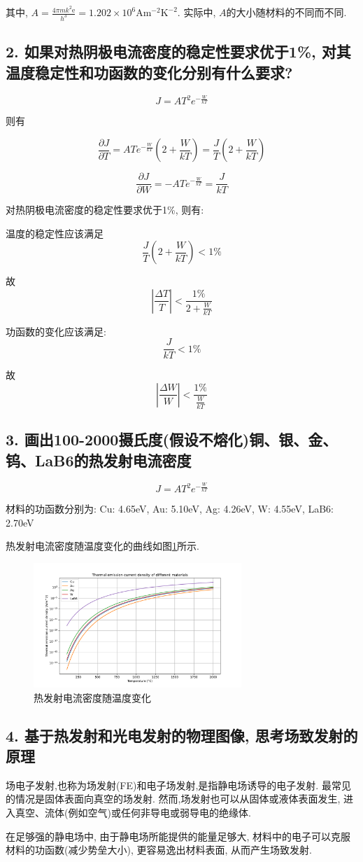 \documentclass{article}
\begin{document}
其中, $A = \frac{4\pi m k^2 \text{e}}{h^3}= 1.202 \times 10^6 \text{A}\text{m}^{-2}\text{K}^{-2}$. 实际中, $A$的大小随材料的不同而不同.

\subsection*{2. 如果对热阴极电流密度的稳定性要求优于1\%, 对其温度稳定性和功函数的变化分别有什么要求?}

$$ J = AT^2 e^{-\frac{W}{kT}}$$

则有

$$\frac{\partial J}{\partial T} = AT e^{-\frac{W}{kT}}\left(2+\frac{W}{kT}\right) = \frac{J}{T}(2+\frac{W}{kT})$$

$$\frac{\partial J}{\partial W} = -AT e^{-\frac{W}{kT}} = \frac{J}{kT}$$

对热阴极电流密度的稳定性要求优于1\%, 则有:

温度的稳定性应该满足 $$\frac{J}{T}(2+\frac{W}{kT})<1\%$$

故$$\left\lvert \frac{\Delta T}{T} \right\rvert <\frac{1\%}{2+\frac{W}{kT}}$$

功函数的变化应该满足: $$\frac{J}{kT}<1\%$$

故$$\left\lvert \frac{\Delta W}{W} \right\rvert <\frac{1\%}{\frac{W}{kT}}$$

\subsection*{3. 画出100-2000摄氏度(假设不熔化)铜、银、金、钨、LaB6的热发射电流密度}

$$J = A T^2 e^{-\frac{W}{kT}}$$

材料的功函数分别为: Cu: 4.65eV, Au: 5.10eV, Ag: 4.26eV, W: 4.55eV, LaB6: 2.70eV

热发射电流密度随温度变化的曲线如图\ref{fig:J-T}所示.

\begin{figure}[ht]
    \centering
    \includegraphics[width=0.7\textwidth]{img/J-T.pdf}
    \caption{热发射电流密度随温度变化}
    \label{fig:J-T}
\end{figure}

\subsection*{4. 基于热发射和光电发射的物理图像, 思考场致发射的原理}

场电子发射,也称为场发射(FE)和电子场发射,是指静电场诱导的电子发射. 最常见的情况是固体表面向真空的场发射. 然而,场发射也可以从固体或液体表面发生, 进入真空、流体(例如空气)或任何非导电或弱导电的绝缘体.\cite{Field-electron-emission}

在足够强的静电场中, 由于静电场所能提供的能量足够大, 材料中的电子可以克服材料的功函数(减少势垒大小), 更容易逸出材料表面, 从而产生场致发射.


\end{document}
